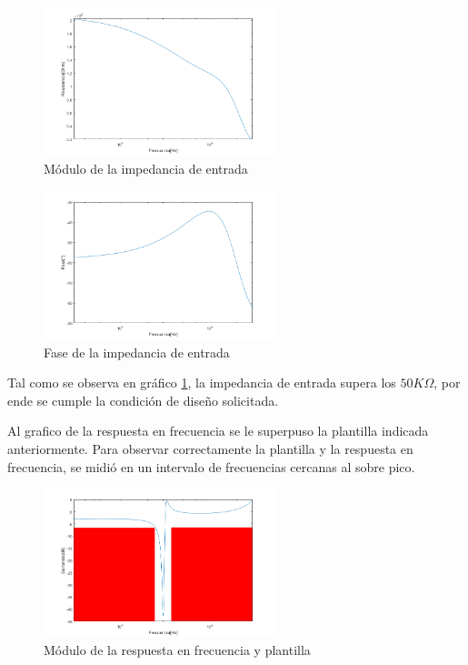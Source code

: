 \documentclass[../../tc_tp5_main.tex]{subfiles}
\begin{document}
\begin{figure}[H]	
	\centering
	\includegraphics[width=0.6\textwidth]{imagenes/zinMag.png} 
	\caption{M\'odulo de la impedancia de entrada}\label{fig:zinmagg}
\end{figure}


\begin{figure}[H]	
	\centering
	\includegraphics[width=0.6\textwidth]{imagenes/zinFase.png}
	\caption{Fase de la impedancia de entrada}
\end{figure}
Tal como se observa en gr\'afico \ref{fig:zinmagg}, la impedancia de entrada supera los $50K\Omega$, por ende se cumple la condición de diseño solicitada.

Al grafico de la respuesta en frecuencia se le superpuso la plantilla indicada anteriormente. Para observar correctamente la plantilla y la respuesta en frecuencia, se midió en un intervalo de frecuencias cercanas al sobre pico.

\begin{figure}[H]	
	\centering
	\includegraphics[width=0.6\textwidth]{imagenes/magplant.png}
	\caption{M\'odulo de la respuesta en frecuencia y plantilla}
\end{figure}
\end{document}
